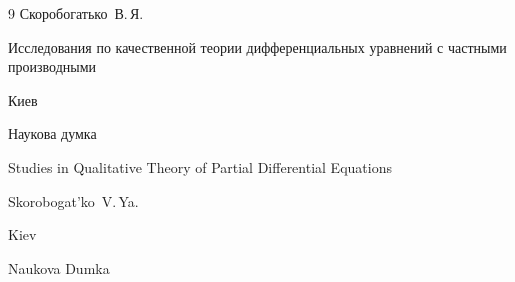 \begin{thebibliography}{9}
\by Скоробогатько~В.\,Я.

\book Исследования по качественной теории дифференциальных уравнений с частными производными

\publaddr Киев

\publ Наукова думка



\misctransl

\book Studies in Qualitative Theory of Partial Differential Equations

\by Skorobogat'ko~V.\,Ya.

\publaddr Kiev

\publ Naukova Dumka







\end{thebibliography}



\noindent

\hskip6.5cm \thedate \par\noindent

\hskip6.5cm\therevdate







\newpage






\makeengtitlem







 \newpage

%


%

%

